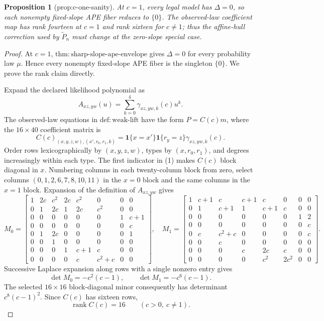 \documentclass{article}
\newtheorem{proposition}{Proposition}
\begin{document}
\begin{proposition}[prop:c-one-sanity]\label{prop:c-one-sanity}
At \(c=1\), every legal model has \(\Delta=0\), so each nonempty fixed-slope APE fiber reduces to \(\{0\}\). The observed-law coefficient map has rank fourteen at \(c=1\) and rank sixteen for \(c\ne1\); thus the affine-hull correction used by \(\widetilde P_n\) must change at the zero-slope special case.
\end{proposition}
\begin{proof}
At \(c=1\), \(\mathrm{thm{:}sharp\text{-}slope\text{-}ape\text{-}envelope}\) gives \(\Delta=0\) for every probability law \(\mu\).  Hence every nonempty fixed-slope APE fiber is the singleton \(\{0\}\).  We prove the rank claim directly.

Expand the declared likelihood polynomial as
\[
 A_{xz,yw}(u)=\sum_{k=0}^4\gamma_{xz,yw,k}(c)u^k.
\]
The observed-law equations in \(\mathrm{def{:}weak\text{-}lift}\) have the form \(P=C(c)m\), where the \(16\times40\) coefficient matrix is
\[
 C(c)_{(x,y,z,w),(x',r_0,r_1,k)}
 =\mathbf 1\{x=x'\}\mathbf 1\{r_y=z\}\gamma_{xz,yw,k}(c). \tag{1}
\]
Order rows lexicographically by \((x,y,z,w)\), types by \((x,r_0,r_1)\), and degrees increasingly within each type.  The first indicator in (1) makes \(C(c)\) block diagonal in \(x\).  Numbering columns in each twenty-column block from zero, select columns \((0,1,2,6,7,8,10,11)\) in the \(x=0\) block and the same columns in the \(x=1\) block.  Expansion of the definition of \(A_{xz,yw}\) gives
\[
M_0=\begin{bmatrix}
1&2c&c^2&2c&c^2&0&0&0\\
0&1&2c&1&2c&c^2&0&0\\
0&0&0&0&0&0&1&c+1\\
0&0&0&0&0&0&0&c\\
0&1&2c&0&0&0&0&1\\
0&0&1&0&0&0&0&0\\
0&0&0&1&c+1&c&0&0\\
0&0&0&0&c&c^2+c&0&0
\end{bmatrix},
\quad
M_1=\begin{bmatrix}
1&c+1&c&c+1&c&0&0&0\\
0&1&c+1&1&c+1&c&0&0\\
0&0&0&0&0&0&1&2\\
0&0&0&0&0&0&0&c\\
0&c&c^2+c&0&0&0&0&c\\
0&0&c&0&0&0&0&0\\
0&0&0&c&2c&c&0&0\\
0&0&0&0&c^2&2c^2&0&0
\end{bmatrix}. \tag{2}
\]
Successive Laplace expansion along rows with a single nonzero entry gives
\[
 \det M_0=-c^2(c-1),
 \qquad
 \det M_1=-c^6(c-1). \tag{3}
\]
The selected \(16\times16\) block-diagonal minor consequently has determinant \(c^8(c-1)^2\).  Since \(C(c)\) has sixteen rows,
\[
 \operatorname{rank}C(c)=16
 \qquad(c>0,\ c\ne1). \tag{4}
\]


\end{proof}
\end{document}
